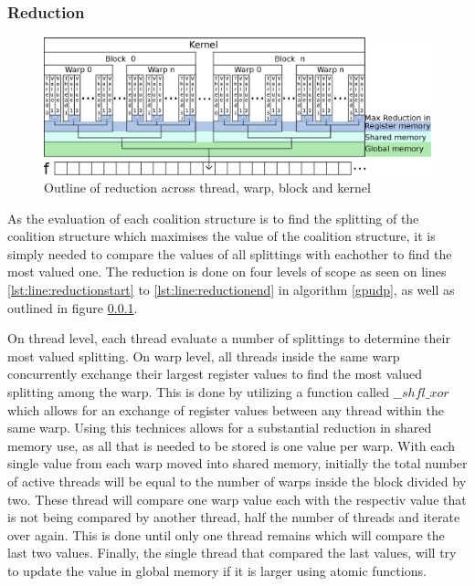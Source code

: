 \documentclass{llncs}
\begin{document}
\subsubsection{Reduction} \label{reduction} %
\begin{figure}
\centering
\includegraphics[width=\linewidth]{reduction}
\caption{Outline of reduction across thread, warp, block and kernel \label{fig:reduction}}
\end{figure}

As the evaluation of each coalition structure is to find the splitting 
of the coalition structure which maximises the value of the coalition structure,
it is simply needed to compare the values of all splittings with eachother to find the most valued one. 
The reduction is done on four levels of scope as seen on lines \ref{lst:line:reductionstart} to \ref{lst:line:reductionend} in algorithm \ref{gpudp},
as well as outlined in figure \ref{reduction}. 

On thread level, each thread evaluate a number of splittings to determine their most valued splitting. 
On warp level, all threads inside the same warp concurrently exchange their largest register values to find the most valued splitting among the warp.
This is done by utilizing a function called $\_\_shfl\_xor$ which allows for an exchange of register values between any thread within the same warp.
Using this technices allows for a substantial reduction in shared memory use, as all that is needed to be stored is one value per warp. 
With each single value from each warp moved into shared memory, initially the total number of active threads will be equal to the number
of warps inside the block divided by two. These thread will compare one warp value each with the respectiv value that is not being compared by
another thread, half the number of threads and iterate over again. This is done until only one thread remains which will compare the last two values.
Finally, the single thread that compared the last values, will try to update the value in global memory if it is larger using atomic functions.
\end{document}
